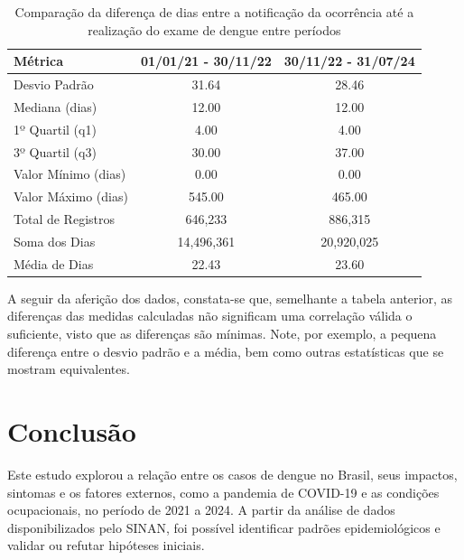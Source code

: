 \documentclass[a4paper,12pt]{article}
\begin{document}
\begin{table}[H]
\centering
\caption{Comparação da diferença de dias entre a notificação da ocorrência até a realização do exame de dengue entre períodos}
\begin{tabular}{@{}l S[table-format=3.2] S[table-format=3.2]@{}}
\toprule
\textbf{Métrica}          & \textbf{01/01/21 - 30/11/22} & \textbf{30/11/22 - 31/07/24} \\ \midrule
Desvio Padrão  & 31.64              & 28.46              \\
Mediana (dias)            & 12.00              & 12.00              \\
1º Quartil (q1)           & 4.00               & 4.00               \\
3º Quartil (q3)           & 30.00              & 37.00              \\
Valor Mínimo (dias)       & 0.00               & 0.00               \\
Valor Máximo (dias)       & 545.00             & 465.00             \\
Total de Registros        & 646,233            & 886,315            \\
Soma dos Dias             & 14,496,361         & 20,920,025         \\
Média de Dias             & 22.43              & 23.60              \\ \bottomrule
\end{tabular}
\label{tab:comparison}
\end{table} 

A seguir da aferição dos dados, constata-se que, semelhante a tabela anterior, as diferenças das medidas calculadas não significam uma correlação válida o suficiente, visto que as diferenças são mínimas. Note, por exemplo, a pequena diferença entre o desvio padrão e a média, bem como outras estatísticas que se mostram equivalentes. 

\section{Conclusão} 


Este estudo explorou a relação entre os casos de dengue no Brasil, seus impactos, sintomas e os fatores externos, como a pandemia de COVID-19 e as condições ocupacionais, no período de 2021 a 2024. A partir da análise de dados disponibilizados pelo SINAN, foi possível identificar padrões epidemiológicos e validar ou refutar hipóteses iniciais.
\end{document}
